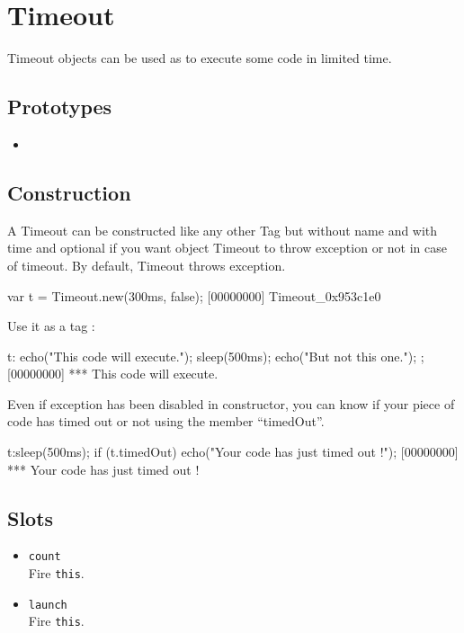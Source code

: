 \section{Timeout}

Timeout objects can be used as  to execute some
code in limited time.

\subsection{Prototypes}
\begin{itemize}
\item {}
\end{itemize}

\subsection{Construction}
A Timeout can be constructed like any other Tag but without name and
with time and optional if you want object Timeout to throw exception
or not in case of timeout. By default, Timeout throws exception.

\begin{urbiscript}
var t = Timeout.new(300ms, false);
[00000000] Timeout_0x953c1e0
\end{urbiscript}

Use it as a tag :

\begin{urbiscript}[firstnumber=last]
t:{
  echo("This code will execute.");
  sleep(500ms);
  echo("But not this one.");
};
[00000000] *** This code will execute.
\end{urbiscript}

Even if exception has been disabled in constructor, you can know if
your piece of code has timed out or not using the member ``timedOut''.

\begin{urbiscript}[firstnumber=last]
t:sleep(500ms);
if (t.timedOut)
  echo("Your code has just timed out !");
[00000000] *** Your code has just timed out !
\end{urbiscript}

\subsection{Slots}
\begin{itemize}
\item \lstinline|count|\\
  Fire \lstinline|this|.

\item \lstinline|launch|\\
  Fire \lstinline|this|.

\end{itemize}

